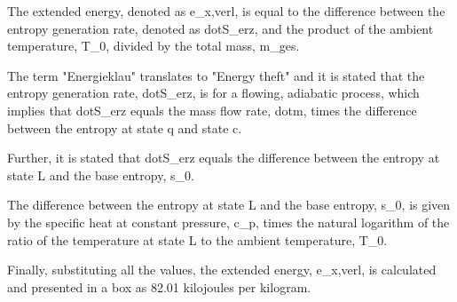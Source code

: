 The extended energy, denoted as e_{x,verl}, is equal to the difference between the entropy generation rate, denoted as dot{S}_{erz}, and the product of the ambient temperature, T_0, divided by the total mass, m_{ges}.

The term "Energieklau" translates to "Energy theft" and it is stated that the entropy generation rate, dot{S}_{erz}, is for a flowing, adiabatic process, which implies that dot{S}_{erz} equals the mass flow rate, dot{m}, times the difference between the entropy at state q and state c.

Further, it is stated that dot{S}_{erz} equals the difference between the entropy at state L and the base entropy, s_0.

The difference between the entropy at state L and the base entropy, s_0, is given by the specific heat at constant pressure, c_p, times the natural logarithm of the ratio of the temperature at state L to the ambient temperature, T_0.

Finally, substituting all the values, the extended energy, e_{x,verl}, is calculated and presented in a box as 82.01 kilojoules per kilogram.